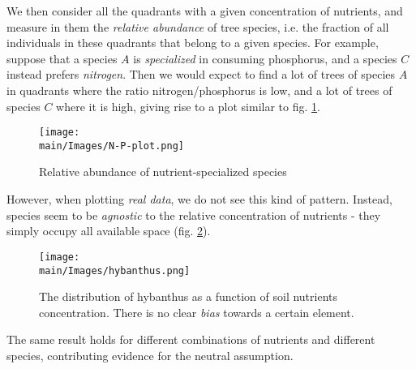 \documentclass[../../main.tex]{subfiles}
\begin{document}
We then consider all the quadrants with a given concentration of nutrients, and measure in them the \textit{relative abundance} of tree species, i.e. the fraction of all individuals in these quadrants that belong to a given species. For example, suppose that a species $A$ is \textit{specialized} in consuming phosphorus, and a species $C$ instead prefers \textit{nitrogen}. Then we would expect to find a lot of trees of species $A$ in quadrants where the ratio nitrogen/phosphorus is low, and a lot of trees of species $C$ where it is high, giving rise to a plot similar to fig. \ref{fig:N-P-plot}.

\begin{figure}[H]
    \centering
    \texttt{[image: \\main/Images/N-P-plot.png]}
    \caption{Relative abundance of nutrient-specialized species}
    \label{fig:N-P-plot}
\end{figure}

However, when plotting \textit{real data}, we do not see this kind of pattern. Instead, species seem to be \textit{agnostic} to the relative concentration of nutrients - they simply occupy all available space (fig. \ref{fig:hybanthus}).

\begin{figure}[H]
    \centering
    \texttt{[image: \\main/Images/hybanthus.png]}
    \caption{The distribution of hybanthus as a function of soil nutrients concentration. There is no clear \textit{bias} towards a certain element.}
    \label{fig:hybanthus}
\end{figure}

The same result holds for different combinations of nutrients and different species, contributing evidence for the neutral assumption.

\medskip
\end{document}
